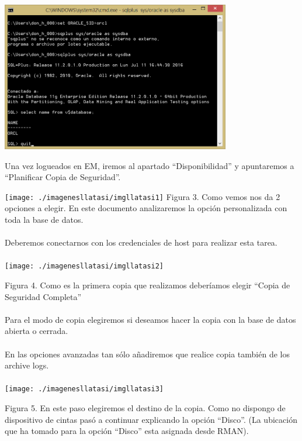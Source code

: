 \documentclass[12pt,letterpaper]{article}
\begin{document}
{\includegraphics[width=10cm]{./imagen/imagen-1}

Una vez logueados en EM, iremos al apartado “Disponibilidad” y apuntaremos a
“Planificar Copia de Seguridad”.

\texttt{[image: ./imagenesllatasi/imgllatasi1]}
Figura 3. Como vemos nos da 2 opciones a elegir. En este documento analizaremos la opción personalizada con toda la base de datos. \\\\

Deberemos conectarnos con los credenciales de host para realizar esta tarea.  \\\\

\texttt{[image: ./imagenesllatasi/imgllatasi2]}

Figura 4. Como  es  la  primera  copia  que  realizamos  deberíamos  elegir  “Copia  de  Seguridad Completa”\\\\

Para el modo de copia elegiremos si deseamos hacer la copia con la base de datos abierta o cerrada.\\\\


En las opciones avanzadas tan sólo añadiremos que realice copia también de los archive logs.\\\\

\texttt{[image: ./imagenesllatasi/imgllatasi3]}

Figura 5. En este paso elegiremos el destino de la copia. Como no dispongo de dispositivo de cintas pasó a continuar explicando la opción “Disco”. (La ubicación que ha tomado para la opción “Disco” esta asignada desde RMAN). \\\\


}
\end{document}
